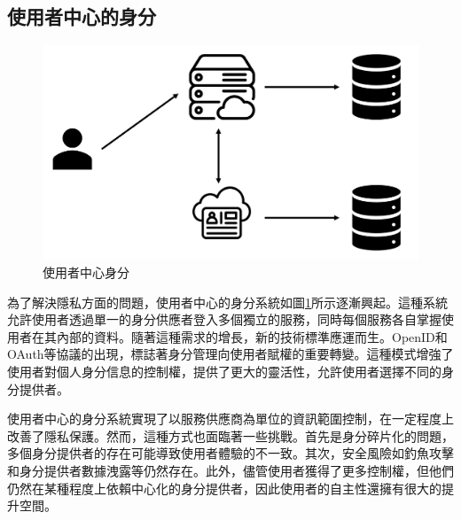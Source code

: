 \subsection{使用者中心的身分}
\begin{figure}
  \centering
  \includegraphics[width=\linewidth,keepaspectratio]{figures/user-mid-identity.png}
  \caption{使用者中心身分}
  \label{fig:user-mid-identity}
\end{figure}
為了解決隱私方面的問題，使用者中心的身分系統如圖\ref{fig:user-mid-identity}所示逐漸興起。這種系統允許使用者透過單一的身分供應者登入多個獨立的服務，同時每個服務各自掌握使用者在其內部的資料。隨著這種需求的增長，新的技術標準應運而生。OpenID和OAuth等協議的出現\cite{sakimura2014openid, hardt2012oauth}，標誌著身分管理向使用者賦權的重要轉變。這種模式增強了使用者對個人身分信息的控制權，提供了更大的靈活性，允許使用者選擇不同的身分提供者。

使用者中心的身分系統實現了以服務供應商為單位的資訊範圍控制，在一定程度上改善了隱私保護。然而，這種方式也面臨著一些挑戰。首先是身分碎片化的問題，多個身分提供者的存在可能導致使用者體驗的不一致。其次，安全風險如釣魚攻擊和身分提供者數據洩露等仍然存在\cite{sun2012devil}。此外，儘管使用者獲得了更多控制權，但他們仍然在某種程度上依賴中心化的身分提供者，因此使用者的自主性還擁有很大的提升空間\cite{allen2016selfsovereign}。
